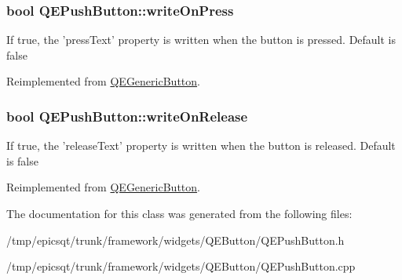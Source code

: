 \hypertarget{classQEPushButton_af37cf41a4f30095f42aa39a5bda5f4b1}{
\subsubsection[{writeOnPress}]{\setlength{\rightskip}{0pt plus 5cm}bool QEPushButton::writeOnPress}}
\label{classQEPushButton_af37cf41a4f30095f42aa39a5bda5f4b1}
If true, the 'pressText' property is written when the button is pressed. Default is false 

Reimplemented from \hyperlink{classQEGenericButton}{QEGenericButton}.

\hypertarget{classQEPushButton_a552f3699d0798cbe9233ff81947d6d7f}{
\subsubsection[{writeOnRelease}]{\setlength{\rightskip}{0pt plus 5cm}bool QEPushButton::writeOnRelease}}
\label{classQEPushButton_a552f3699d0798cbe9233ff81947d6d7f}
If true, the 'releaseText' property is written when the button is released. Default is false 

Reimplemented from \hyperlink{classQEGenericButton}{QEGenericButton}.



The documentation for this class was generated from the following files:\begin{DoxyCompactItemize}
\item 
/tmp/epicsqt/trunk/framework/widgets/QEButton/QEPushButton.h\item 
/tmp/epicsqt/trunk/framework/widgets/QEButton/QEPushButton.cpp\end{DoxyCompactItemize}
